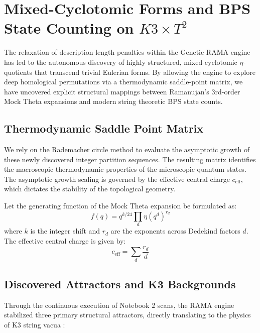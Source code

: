 \section{Mixed-Cyclotomic Forms and BPS State Counting on $K3 \times T^2$}

The relaxation of description-length penalties within the Genetic RAMA engine has led to the autonomous discovery of highly structured, mixed-cyclotomic $\eta$-quotients that transcend trivial Eulerian forms. By allowing the engine to explore deep homological permutations via a thermodynamic saddle-point matrix, we have uncovered explicit structural mappings between Ramanujan's 3rd-order Mock Theta expansions and modern string theoretic BPS state counts.

\subsection{Thermodynamic Saddle Point Matrix}
We rely on the Rademacher circle method to evaluate the asymptotic growth of these newly discovered integer partition sequences. The resulting matrix identifies the macroscopic thermodynamic properties of the microscopic quantum states. The asymptotic growth scaling is governed by the effective central charge $c_{\text{eff}}$, which dictates the stability of the topological geometry. 

Let the generating function of the Mock Theta expansion be formulated as:
\begin{equation}
f(q) = q^{k/24} \prod_{d} \eta(q^d)^{r_d}
\end{equation}
where $k$ is the integer shift and $r_d$ are the exponents across Dedekind factors $d$. The effective central charge is given by:
\begin{equation}
c_{\text{eff}} = \sum_{d} \frac{r_d}{d}
\end{equation}

\subsection{Discovered Attractors and K3 Backgrounds}

Through the continuous execution of Notebook 2 scans, the RAMA engine stabilized three primary structural attractors, directly translating to the physics of K3 string vacua \cite{EOT2011}:

